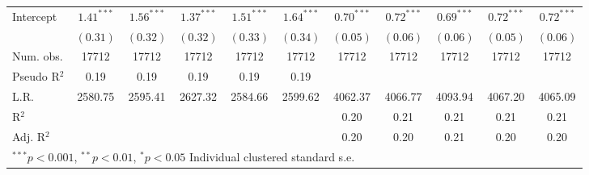 \begin{table}
\begin{center}
\begin{tabular}{l c c c c c c c c c c }
Intercept          & $1.41^{***}$  & $1.56^{***}$  & $1.37^{***}$  & $1.51^{***}$  & $1.64^{***}$  & $0.70^{***}$  & $0.72^{***}$  & $0.69^{***}$  & $0.72^{***}$  & $0.72^{***}$  \\
                   & $(0.31)$      & $(0.32)$      & $(0.32)$      & $(0.33)$      & $(0.34)$      & $(0.05)$      & $(0.06)$      & $(0.06)$      & $(0.05)$      & $(0.06)$      \\
\hline
Num. obs.          & 17712         & 17712         & 17712         & 17712         & 17712         & 17712         & 17712         & 17712         & 17712         & 17712         \\
Pseudo R$^2$       & 0.19          & 0.19          & 0.19          & 0.19          & 0.19          &               &               &               &               &               \\
L.R.               & 2580.75       & 2595.41       & 2627.32       & 2584.66       & 2599.62       & 4062.37       & 4066.77       & 4093.94       & 4067.20       & 4065.09       \\
R$^2$              &               &               &               &               &               & 0.20          & 0.21          & 0.21          & 0.21          & 0.21          \\
Adj. R$^2$         &               &               &               &               &               & 0.20          & 0.20          & 0.21          & 0.20          & 0.20          \\
\hline
\multicolumn{11}{l}{\scriptsize{$^{***}p<0.001$, $^{**}p<0.01$, $^*p<0.05$ Individual clustered standard s.e.}}
\end{tabular}
\label{table:int_models}
\end{center}
\end{table}
